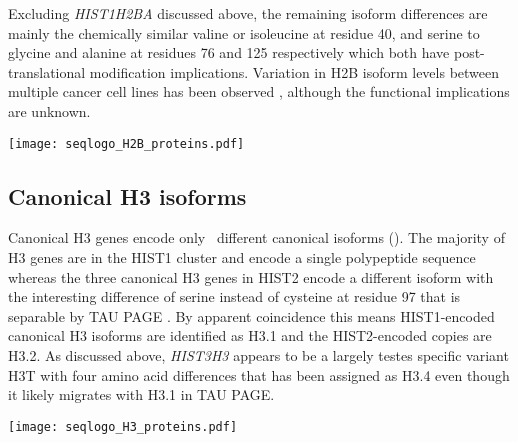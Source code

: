     Excluding \textit{HIST1H2BA} discussed above,
    the remaining isoform differences are mainly the chemically
    similar valine or isoleucine at residue 40,
    and serine to glycine and alanine at residues 76 and 125 respectively
    which both have post-translational modification implications.
    Variation in H2B isoform levels between multiple cancer cell
    lines has been observed \citep{Molden2015},
    although the functional implications are unknown.

    \begin{table}
      \caption{%
        Canonical H2B protein isoforms.  Upper panel shows isoforms
        relative to the most common protein sequence.  Lower panel
        shows sequence logo of all isoforms aligned with invariant
        residues in grey.
      }
      \label{tab:H2B-consensus}
      
      \texttt{[image: seqlogo\_H2B\_proteins.pdf]}
    \end{table}

  \subsection{Canonical H3 isoforms}
    Canonical H3 genes encode only \HThreeUniqueProteins{}~different
    canonical isoforms ().
    The majority of H3 genes are in the HIST1 cluster and encode a
    single polypeptide sequence \citep{Ederveen2011}
    whereas the three canonical H3 genes in HIST2 encode a different isoform
    with the interesting difference of serine instead of cysteine at residue 97
    that is separable by TAU PAGE \citep{FranklinZweidler1977}.
    By apparent coincidence this means HIST1-encoded canonical H3 isoforms are
    identified as H3.1 and the HIST2-encoded copies are H3.2.
    As discussed above, \textit{HIST3H3} appears to be
    a largely testes specific variant H3T
    with four amino acid differences that has been assigned as H3.4 \citep{Talbert2012}
    even though it likely migrates with H3.1 in TAU PAGE.

    \begin{table}
      \caption{%
        Canonical H3 protein isoforms.  Upper panel shows isoforms
        relative to the most common protein sequence.  Lower panel
        shows sequence logo of all isoforms aligned with invariant
        residues in grey.
      }
      \label{tab:H3-consensus}
      
      \texttt{[image: seqlogo\_H3\_proteins.pdf]}
    \end{table}

